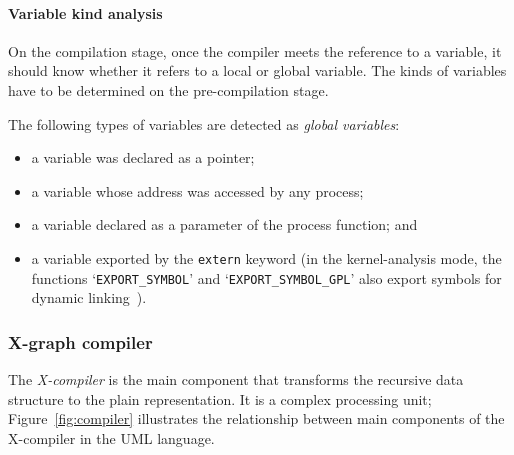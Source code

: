 

\paragraph{Variable kind analysis}

On the compilation stage, once the compiler meets the reference to a variable, it should know whether it refers to a local or global variable.
The kinds of variables have to be determined on the pre-compilation stage.

The following types of variables are detected as \textit{global variables}:
\begin{itemize}[noitemsep,topsep=0pt]
\item a variable was declared as a pointer;
\item a variable whose address was accessed by any process;
\item a variable declared as a parameter of the process function; and
\item a variable exported by the \texttt{extern} keyword (in the kernel-analysis mode, the functions `\lstinline{EXPORT_SYMBOL}' and `\lstinline{EXPORT_SYMBOL_GPL}' also export symbols for dynamic linking~\cite{argawal16kernel}).
\end{itemize}


\subsubsection{X-graph compiler}
\label{ch:impl:proc:x-compiler}

The \textit{X-compiler} is the main component that transforms the recursive \ytree{} data structure to the plain \xgraph{} representation.
It is a complex processing unit; Figure~\ref{fig:compiler} illustrates the relationship between main components of the X-compiler in the UML language.

